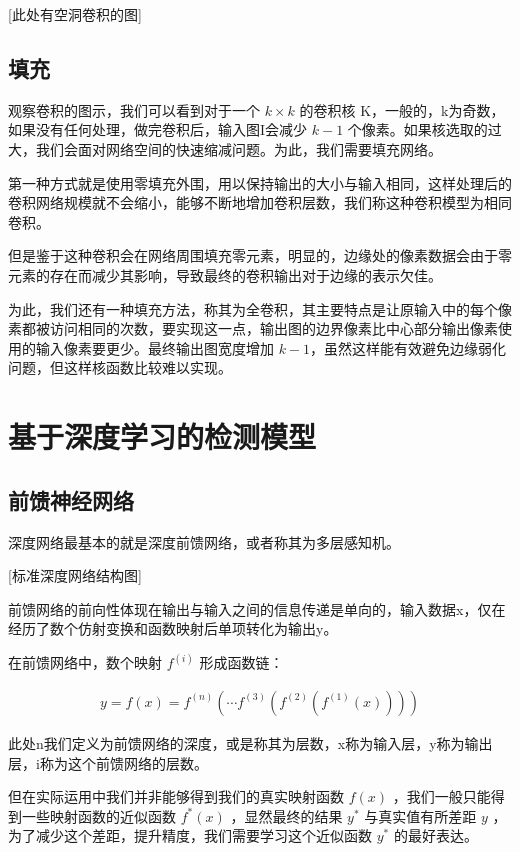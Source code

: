[此处有空洞卷积的图]

\subsection{填充}

观察卷积的图示，我们可以看到对于一个 $ k \times k $ 的卷积核 K，一般的，k为奇数，如果没有任何处理，做完卷积后，输入图I会减少 $ k - 1 $ 个像素。如果核选取的过大，我们会面对网络空间的快速缩减问题。为此，我们需要填充网络。

第一种方式就是使用零填充外围，用以保持输出的大小与输入相同，这样处理后的卷积网络规模就不会缩小，能够不断地增加卷积层数，我们称这种卷积模型为相同卷积。

但是鉴于这种卷积会在网络周围填充零元素，明显的，边缘处的像素数据会由于零元素的存在而减少其影响，导致最终的卷积输出对于边缘的表示欠佳。

为此，我们还有一种填充方法，称其为全卷积，其主要特点是让原输入中的每个像素都被访问相同的次数，要实现这一点，输出图的边界像素比中心部分输出像素使用的输入像素要更少。最终输出图宽度增加 $ k-1 $，虽然这样能有效避免边缘弱化问题，但这样核函数比较难以实现。


\section{基于深度学习的检测模型}

\subsection{前馈神经网络}
深度网络最基本的就是深度前馈网络，或者称其为多层感知机。

[标准深度网络结构图]

前馈网络的前向性体现在输出与输入之间的信息传递是单向的，输入数据x，仅在经历了数个仿射变换和函数映射后单项转化为输出y。

在前馈网络中，数个映射 $ f^{(i)} $ 形成函数链：

\begin{eqnarray}
    y = f(x) = f^{(n)}(\cdots f^{(3)}(f^{(2)}(f^{(1)}(x))))
\end{eqnarray}

此处n我们定义为前馈网络的深度，或是称其为层数，x称为输入层，y称为输出层，i称为这个前馈网络的层数。

但在实际运用中我们并非能够得到我们的真实映射函数 $ f(x) $ ，我们一般只能得到一些映射函数的近似函数 $ f^{\ast}(x) $ ，显然最终的结果 $ y^{\ast} $ 与真实值有所差距 $ y $ ，为了减少这个差距，提升精度，我们需要学习这个近似函数 $ y^{\ast} $ 的最好表达。

